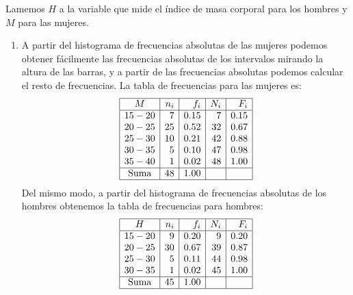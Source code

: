 {Lamemos $H$ a la variable que mide el índice de masa corporal para los hombres y $M$ para las mujeres.
\begin{enumerate}
\item A partir del histograma de frecuencias absolutas de las mujeres podemos obtener fácilmente las frecuencias absolutas de los intervalos mirando la altura de las barras, y a partir de las frecuencias absolutas podemos calcular el resto de frecuencias.
La tabla de frecuencias para las mujeres es:
\[
\begin{array}{|c|r|r|r|r|}
\hline
   M   & n_i &  f_i & N_i &  F_i \\
\hline
 15-20 &   7 & 0.15 &   7 & 0.15 \\
 20-25 &  25 & 0.52 &  32 & 0.67 \\
 25-30 &  10 & 0.21 &  42 & 0.88 \\
 30-35 &   5 & 0.10 &  47 & 0.98 \\
 35-40 &   1 & 0.02 &  48 & 1.00 \\
\hline
\mbox{Suma} & 48 & 1.00 & & \\
\hline
\end{array}
\]
Del mismo modo, a partir del histograma de frecuencias absolutas de los hombres obtenemos la tabla de frecuencias para hombres:
\[
\begin{array}{|c|r|r|r|r|}
\hline
   H   & n_i &  f_i & N_i &  F_i \\
\hline
 15-20 &   9 & 0.20 &   9 & 0.20 \\
 20-25 &  30 & 0.67 &  39 & 0.87 \\
 25-30 &   5 & 0.11 &  44 & 0.98 \\
 30-35 &   1 & 0.02 &  45 & 1.00 \\
\hline
\mbox{Suma} & 45 & 1.00 & & \\
\hline
\end{array}
\]


\end{enumerate}}
